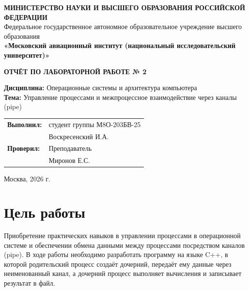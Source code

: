 \documentclass[11pt, a4paper]{article}
\begin{document}
\begin{titlepage}
    \begin{center}
        \Large\textbf{МИНИСТЕРСТВО НАУКИ И ВЫСШЕГО ОБРАЗОВАНИЯ РОССИЙСКОЙ ФЕДЕРАЦИИ} \\
        \vspace{0.3cm}
        \large Федеральное государственное автономное образовательное учреждение высшего образования \\
        \textbf{«Московский авиационный институт (национальный исследовательский университет)»}
    \end{center}

    \vspace{3cm}

    \begin{center}
        \huge\textbf{ОТЧЁТ ПО ЛАБОРАТОРНОЙ РАБОТЕ № 2}
    \end{center}

    \vspace{1.5cm}

    \begin{center}
        \large\textbf{Дисциплина:} Операционные системы и архитектура компьютера \\
        \vspace{0.5cm}
        \large\textbf{Тема:} Управление процессами и межпроцессное взаимодействие через каналы (pipe)
    \end{center}

    \vspace{3cm}

    \begin{flushright}
        \begin{tabular}{ll}
            \textbf{Выполнил:} & студент группы М8О-203БВ-25 \\
                               & Воскресенский И.А. \\[1cm]
            \textbf{Проверил:} & Преподаватель \\
                               & Миронов Е.С. \\
        \end{tabular}
    \end{flushright}

    \vfill

    \begin{center}
        \large Москва, 2026 г.
    \end{center}
\end{titlepage}

\section{Цель работы}
Приобретение практических навыков в управлении процессами в операционной системе и обеспечении обмена данными между процессами посредством каналов (pipe). В ходе работы необходимо разработать программу на языке C++, в которой родительский процесс создаёт дочерний, передаёт ему данные через неименованный канал, а дочерний процесс выполняет вычисления и записывает результат в файл.
\end{document}
